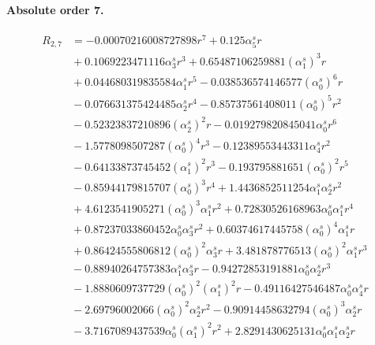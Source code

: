 \documentclass[10pt]{article}
\begin{document}
\paragraph{Absolute order 7.}
\begin{align*}
R_{2,7} &=  - 0.00070216008727898 r^{7} + 0.125 \alpha_{5}^s r \\
&{}  + 0.1069223471116 \alpha_{3}^s r^{3} + 0.65487106259881 \left(\alpha_{1}^s\right)^{3} r \\
&{}  + 0.044680319835584 \alpha_{1}^s r^{5} - 0.038536574146577 \left(\alpha_{0}^s\right)^{6} r \\
&{}  - 0.076631375424485 \alpha_{2}^s r^{4} - 0.85737561408011 \left(\alpha_{0}^s\right)^{5} r^{2} \\
&{}  - 0.52323837210896 \left(\alpha_{2}^s\right)^{2} r - 0.019279820845041 \alpha_{0}^s r^{6} \\
&{}  - 1.5778098507287 \left(\alpha_{0}^s\right)^{4} r^{3} - 0.12389553443311 \alpha_{4}^s r^{2} \\
&{}  - 0.64133873745452 \left(\alpha_{1}^s\right)^{2} r^{3} - 0.193795881651 \left(\alpha_{0}^s\right)^{2} r^{5} \\
&{}  - 0.85944179815707 \left(\alpha_{0}^s\right)^{3} r^{4} + 1.4436852511254 \alpha_{1}^s \alpha_{2}^s r^{2} \\
&{}  + 4.6123541905271 \left(\alpha_{0}^s\right)^{3} \alpha_{1}^s r^{2} + 0.72830526168963 \alpha_{0}^s \alpha_{1}^s r^{4} \\
&{}  + 0.87237033860452 \alpha_{0}^s \alpha_{3}^s r^{2} + 0.60374617445758 \left(\alpha_{0}^s\right)^{4} \alpha_{1}^s r \\
&{}  + 0.86424555806812 \left(\alpha_{0}^s\right)^{2} \alpha_{3}^s r + 3.481878776513 \left(\alpha_{0}^s\right)^{2} \alpha_{1}^s r^{3} \\
&{}  - 0.88940264757383 \alpha_{1}^s \alpha_{3}^s r - 0.94272853191881 \alpha_{0}^s \alpha_{2}^s r^{3} \\
&{}  - 1.8880609737729 \left(\alpha_{0}^s\right)^{2} \left(\alpha_{1}^s\right)^{2} r - 0.49116427546487 \alpha_{0}^s \alpha_{4}^s r \\
&{}  - 2.69796002066 \left(\alpha_{0}^s\right)^{2} \alpha_{2}^s r^{2} - 0.90914458632794 \left(\alpha_{0}^s\right)^{3} \alpha_{2}^s r \\
&{}  - 3.7167089437539 \alpha_{0}^s \left(\alpha_{1}^s\right)^{2} r^{2} + 2.8291430625131 \alpha_{0}^s \alpha_{1}^s \alpha_{2}^s r
\end{align*}
\end{document}
